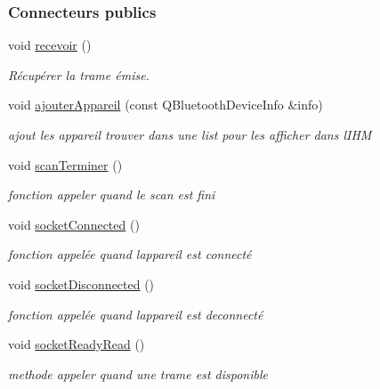 \subsubsection*{Connecteurs publics}
\begin{DoxyCompactItemize}
\item 
void \hyperlink{class_transmission_aa54a695d9d1c728ccab04f1d8030da41}{recevoir} ()
\begin{DoxyCompactList}\small\item\em Récupérer la trame émise. \end{DoxyCompactList}\item 
void \hyperlink{class_transmission_aeeccf41fd32a4bb17d3312d785aec98a}{ajouter\+Appareil} (const Q\+Bluetooth\+Device\+Info \&info)
\begin{DoxyCompactList}\small\item\em ajout les appareil trouver dans une list pour les afficher dans l\textquotesingle{}I\+HM \end{DoxyCompactList}\item 
void \hyperlink{class_transmission_a6945e6b653c6d46d7e13484811647e6e}{scan\+Terminer} ()
\begin{DoxyCompactList}\small\item\em fonction appeler quand le scan est fini \end{DoxyCompactList}\item 
void \hyperlink{class_transmission_ad231163c435936cc69149dd03aaaf473}{socket\+Connected} ()
\begin{DoxyCompactList}\small\item\em fonction appelée quand l\textquotesingle{}appareil est connecté \end{DoxyCompactList}\item 
void \hyperlink{class_transmission_a5b02dec98a34f14b341adf40cf520bdf}{socket\+Disconnected} ()
\begin{DoxyCompactList}\small\item\em fonction appelée quand l\textquotesingle{}appareil est deconnecté \end{DoxyCompactList}\item 
void \hyperlink{class_transmission_a3beab187cc2056a8f34bc6643fdc0e26}{socket\+Ready\+Read} ()
\begin{DoxyCompactList}\small\item\em methode appeler quand une trame est disponible \end{DoxyCompactList}\end{DoxyCompactItemize}
